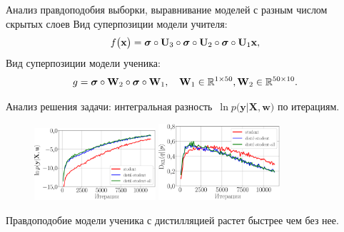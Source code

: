 \documentclass[10pt,pdf,hyperref={unicode}]{beamer}
\begin{document}

\begin{frame}{Анализ правдоподобия выборки, выравнивание моделей с разным числом скрытых слоев}
\justifying
Вид суперпозиции модели учителя:
$$
\setlength\abovedisplayskip{0pt}
f\bigr(\mathbf{x}\bigr) = \bm{\sigma} \circ \mathbf{U}_3\circ \bm{\sigma} \circ \mathbf{U}_2\circ\bm{\sigma}\circ \mathbf{U}_1\mathbf{x},
\setlength\belowdisplayskip{0pt}
$$
Вид суперпозиции модели ученика:
$$
\setlength\abovedisplayskip{0pt}
g = \bm{\sigma} \circ \mathbf{W}_2 \circ \bm{\sigma} \circ \mathbf{W}_1, \quad \mathbf{W}_{1} \in \mathbb{R}^{1 \times 50}, \mathbf{W}_{2} \in \mathbb{R}^{50 \times 10}.
\setlength\belowdisplayskip{0pt}
$$
\begin{table}[]
\begin{center}
\end{center}
\end{table}

Анализ решения задачи: интегральная разность~$\ln p\bigr(\mathbf{y}|\mathbf{X}, \mathbf{w}\bigr)$ по итерациям.
\begin{figure}[h!]
\includegraphics[width=0.4\textwidth]{figures/synthetic_likelihood_2_layers.eps}
\includegraphics[width=0.4\textwidth]{figures/synthetic_D_KL_2_layers.eps}
\end{figure}

Правдоподобие модели ученика с дистилляцией растет быстрее чем без нее.

\end{frame}
\end{document}

